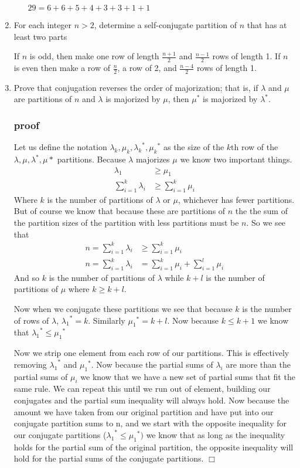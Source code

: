\documentclass{article}
\begin{document}
\begin{enumerate}
\begin{enumerate}
    $29=6+6+5+4+3+3+1+1$
  \end{enumerate}
  \item
  For each integer $n>2$, determine a self-conjugate partition of $n$ that has at least two parts

  If $n$ is odd, then make one row of length $\frac{n+1}{2}$ and $\frac{n-1}{2}$ rows of length 1. If $n$ is even then make a row of $\frac{n}{2}$, a row of 2, and $\frac{n-4}{2}$ rows of length 1.
  \item
  Prove that conjugation reverses the order of majorization; that is, if $\lambda$ and $\mu$ are partitions of $n$ and $\lambda$ is majorized by $\mu$, then $\mu^*$ is majorized by $\lambda^*$.
  \subsubsection*{proof}
  Let us define the notation $\lambda_k, \mu_k, {\lambda_k}^*,{\mu_k}^*$ as the size of the $k$th row of the $\lambda,\mu,\lambda^*,\mu*$ partitions. Because $\lambda$ majorizes $\mu$ we know two important things.
  \begin{align*}
    \lambda_1&\ge\mu_1\\
    \sum\limits_{i=1}^k{\lambda_i}&\ge\sum\limits_{i=1}^k{\mu_i}
  \end{align*}
  Where $k$ is the number of partitions of $\lambda$ or $\mu$, whichever has fewer partitions. But of course we know that because these are partitions of $n$ the the sum of the partition sizes of the partition with less partitions must be $n$. So we see that
  \begin{align*}
    n=\sum\limits_{i=1}^k{\lambda_i}&\ge\sum\limits_{i=1}^k{\mu_i}\\
    n=\sum\limits_{i=1}^k{\lambda_i}&=\sum\limits_{i=1}^k{\mu_i}+\sum\limits_{i=1}^l{\mu_i}
  \end{align*}
  And so $k$ is the number of partitions of $\lambda$ while $k+l$ is the number of partitions of $\mu$ where $k\ge{k+l}$.

  Now when we conjugate these partitions we see that because $k$ is the number of rows of $\lambda$, ${\lambda_1}^*=k$. Similarly ${\mu_1}^*=k+l$. Now because $k\le{k+1}$ we know that ${\lambda_1}^*\le{\mu_1}^*$

  Now we strip one element from each row of our partitions. This is effectively removing ${\lambda_1}^*$ and ${\mu_1}^*$. Now because the partial sums of $\lambda_i$ are more than the partial sums of $\mu_i$ we know that we have a new set of partial sums that fit the same rule.
  We can repeat this until we run out of element, building our conjugates and the partial sum inequality will always hold. Now because the amount we have taken from our original partition and have put into our conjugate partition sums to n, and we start with the opposite inequality for our conjugate partitions (${\lambda_1}^*\le{\mu_1}^*)$ we know that as long as the inequality holds for the partial sum of the original partition, the opposite inequality will hold for the partial sums of the conjugate partitions. $\Box$


\end{enumerate}
\end{document}

